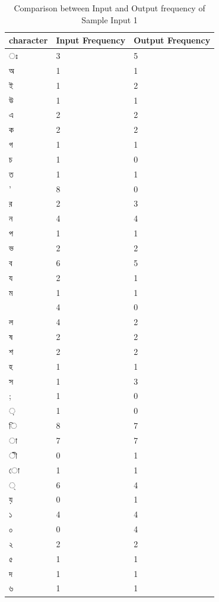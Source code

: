 \begin{table}[H]
\centering
\begin{tabular}{|p{2cm}|p{2cm}|p{2cm}|}
\hline
character & Input Frequency & Output Frequency \\
\hline
{\bengalifont ঃ} & 3 & 5\\
\hline
{\bengalifont অ} & 1 & 1\\
\hline
{\bengalifont ই} & 1 & 2\\
\hline
{\bengalifont উ} & 1 & 1\\
\hline
{\bengalifont এ} & 2 & 2\\
\hline
{\bengalifont ক} & 2 & 2\\
\hline
{\bengalifont গ} & 1 & 1\\
\hline
{\bengalifont চ} & 1 & 0\\
\hline
{\bengalifont ত} & 1 & 1\\
\hline
{\bengalifont '} & 8 & 0\\
\hline
{\bengalifont র} & 2 & 3\\
\hline
{\bengalifont ন} & 4 & 4\\
\hline
{\bengalifont প} & 1 & 1\\
\hline
{\bengalifont ভ} & 2 & 2\\
\hline
{\bengalifont ব} & 6 & 5\\
\hline
{\bengalifont য} & 2 & 1\\
\hline
{\bengalifont ম} & 1 & 1\\
\hline
{\bengalifont 0} & 4 & 0\\
\hline
{\bengalifont ল} & 4 & 2\\
\hline
{\bengalifont ষ} & 2 & 2\\
\hline
{\bengalifont শ} & 2 & 2\\
\hline
{\bengalifont হ} & 1 & 1\\
\hline
{\bengalifont স} & 1 & 3\\
\hline
{\bengalifont ;} & 1 & 0\\
\hline
{\bengalifont ়} & 1 & 0\\
\hline
{\bengalifont ি} & 8 & 7\\
\hline
{\bengalifont া} & 7 & 7\\
\hline
{\bengalifont ী} & 0 & 1\\
\hline
{\bengalifont ো} & 1 & 1\\
\hline
{\bengalifont ্} & 6 & 4\\
\hline
{\bengalifont য়} & 0 & 1\\
\hline
{\bengalifont ১} & 4 & 4\\
\hline
{\bengalifont ০} & 0 & 4\\
\hline
{\bengalifont ২} & 2 & 2\\
\hline
{\bengalifont ৫} & 1 & 1\\
\hline
{\bengalifont দ} & 1 & 1\\
\hline
{\bengalifont ৬} & 1 & 1\\
\hline
\end{tabular}
\caption { Comparison between Input and Output frequency of Sample Input 1}
\label {tab:BTable1}
\end{table}


